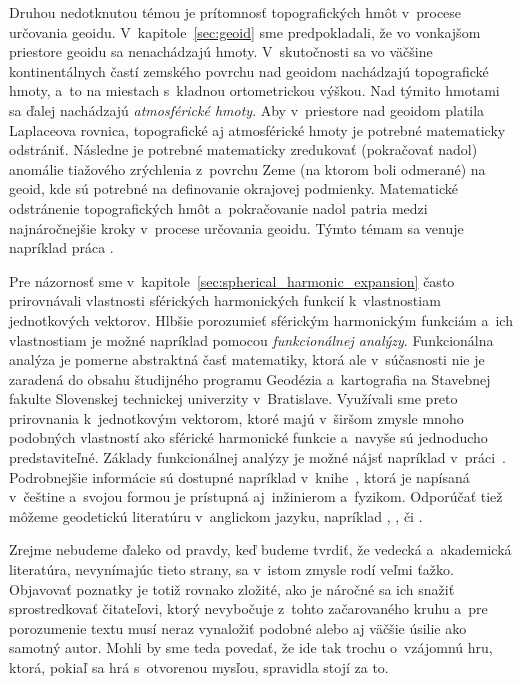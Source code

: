 \documentclass[a4paper, 12pt]{book}
\begin{document}
Druhou nedotknutou témou je prítomnosť topografických hmôt v~procese určovania 
geoidu.  V~kapitole~\ref{sec:geoid} sme predpokladali, že vo vonkajšom 
priestore geoidu sa nenachádzajú hmoty.  V~skutočnosti sa vo väčšine 
kontinentálnych častí zemského povrchu nad geoidom nachádzajú topografické 
hmoty, a~to na miestach s~kladnou ortometrickou výškou.  Nad týmito hmotami sa 
ďalej nachádzajú \emph{atmosférické hmoty}.  Aby v~priestore nad geoidom 
platila Laplaceova rovnica, topografické aj atmosférické hmoty je potrebné 
matematicky odstrániť.  Následne je potrebné matematicky zredukovať (pokračovať 
nadol) anomálie tiažového zrýchlenia z~povrchu Zeme (na ktorom boli odmerané) 
na geoid, kde sú potrebné na definovanie okrajovej podmienky.  Matematické 
odstránenie topografických hmôt a~pokračovanie nadol patria medzi 
najnáročnejšie kroky v~procese určovania geoidu.  Týmto témam sa venuje 
napríklad práca \textcite{Janak2006}.

Pre názornosť sme v~kapitole~\ref{sec:spherical_harmonic_expansion} často 
prirovnávali vlastnosti sférických harmonických funkcií k~vlastnostiam 
jednotkových vektorov.  Hlbšie porozumieť sférickým harmonickým funkciám a~ich 
vlastnostiam je možné napríklad pomocou \emph{funkcionálnej analýzy}.  
Funkcionálna analýza je pomerne abstraktná časť matematiky, ktorá ale 
v~súčasnosti nie je zaradená do obsahu študijného programu Geodézia 
a~kartografia na Stavebnej fakulte Slovenskej technickej univerzity 
v~Bratislave.  Využívali sme preto prirovnania k~jednotkovým vektorom, ktoré 
majú v~širšom zmysle mnoho podobných vlastností ako sférické harmonické funkcie 
a~navyše sú jednoducho predstaviteľné.  Základy funkcionálnej analýzy je možné 
nájsť napríklad v~práci~\textcite{Janak2006}.  Podrobnejšie informácie sú 
dostupné napríklad v~knihe~\textcite{Rektorys}, ktorá je napísaná v~češtine 
a~svojou formou je prístupná aj~inžinierom a~fyzikom.  Odporúčať tiež môžeme 
geodetickú literatúru v~anglickom jazyku, napríklad 
\textcite{MoritzAdvancedGeodesy}, \textcite{SansoGeoidDetermination}, 
\textcite{Borre2006} či \textcite{Freeden2009}.

Zrejme nebudeme ďaleko od pravdy, keď budeme tvrdiť, že vedecká a~akademická 
literatúra, nevynímajúc tieto strany, sa v~istom zmysle rodí veľmi ťažko.  
Objavovať poznatky je totiž rovnako zložité, ako je náročné sa ich snažiť 
sprostredkovať čitateľovi, ktorý nevybočuje z~tohto začarovaného kruhu a~pre 
porozumenie textu musí neraz vynaložiť podobné alebo aj väčšie úsilie ako 
samotný autor.  Mohli by sme teda povedať, že ide tak trochu o~vzájomnú hru, 
ktorá, pokiaľ sa hrá s~otvorenou mysľou, spravidla stojí za to.
\end{document}
